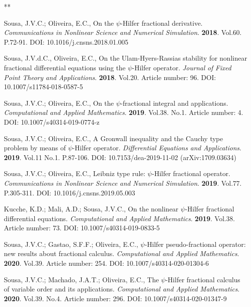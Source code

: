 \documentclass[12pt]{article}
\begin{document}
\begin{thebibliography}{**}

Sousa, J.V.C.; Oliveira, E.C.,
On the $\psi$-Hilfer fractional derivative. 
\textit{Communications in Nonlinear Science and Numerical Simulation}.
\textbf{2018}. Vol.60. P.72-91.
DOI: 10.1016/j.cnsns.2018.01.005

Sousa, J.V.d.C., Oliveira, E.C., 
On the Ulam-Hyers-Rassias stability for nonlinear fractional differential equations using the $\psi$-Hilfer operator. 
\textit{Journal of Fixed Point Theory and Applications}.
\textbf{2018}. Vol.20. Article number: 96. 
DOI: 10.1007/s11784-018-0587-5

Sousa, J.V.C.; Oliveira, E.C.,
On the $\psi$-fractional integral and applications. 
\textit{Computational and Applied Mathematics}.
\textbf{2019}. Vol.38. No.1. Article number: 4. 
DOI: 10.1007/s40314-019-0774-z

Sousa, J.V.C.; Oliveira, E.C.,
A Gronwall inequality and the Cauchy type problem by means of $\psi$-Hilfer operator. 
\textit{Differential Equations and Applications}.
\textbf{2019}. Vol.11 No.1. P.87-106.
DOI: 10.7153/dea-2019-11-02
(arXiv:1709.03634)

Sousa, J.V.C.; Oliveira, E.C.,
Leibniz type rule: $\psi$-Hilfer fractional operator. 
\textit{Communications in Nonlinear Science and Numerical Simulation}.
\textbf{2019}. Vol.77. P.305-311.
DOI: 10.1016/j.cnsns.2019.05.003

Kucche, K.D.; Mali, A.D.; Sousa, J.V.C., 
On the nonlinear $\psi$-Hilfer fractional differential equations. 
\textit{Computational and Applied Mathematics}.
\textbf{2019}. Vol.38. Article number: 73. 
DOI: 10.1007/s40314-019-0833-5

Sousa, J.V.C.; Gastao, S.F.F.; Oliveira, E.C.,
$\psi$-Hilfer pseudo-fractional operator: new results
about fractional calculus. 
\textit{Computational and Applied Mathematics}.
\textbf{2020}. Vol.39. Article number: 254.
DOI: 10.1007/s40314-020-01304-6

Sousa, J.V.C.; Machado, J.A.T.; Oliveira, E.C.,
The $\psi$-Hilfer fractional calculus of variable order and its applications. 
\textit{Computational and Applied Mathematics}.
\textbf{2020}. Vol.39. No.4. Article number: 296.
DOI: 10.1007/s40314-020-01347-9



\end{thebibliography}
\end{document}
